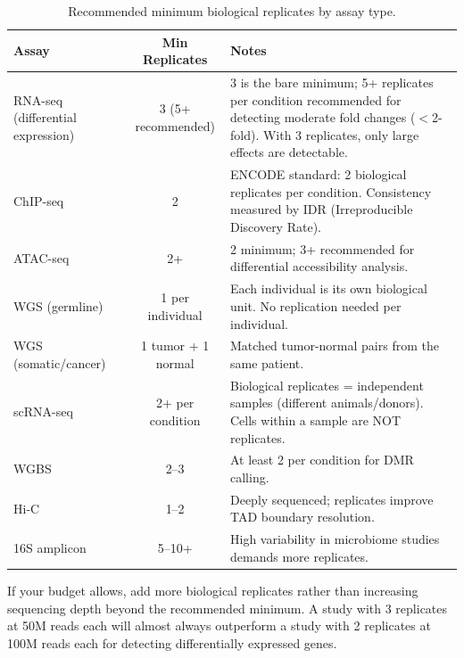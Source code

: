 \begin{table}[htbp]
\centering
\caption{Recommended minimum biological replicates by assay type.}
\label{tab:min-replicates}
\small
\renewcommand{\arraystretch}{1.3}
\begin{tabularx}{\textwidth}{@{}l c X@{}}
\toprule
\textbf{Assay} & \textbf{Min Replicates} & \textbf{Notes} \\
\midrule
RNA-seq (differential expression) & 3 (5+ recommended) & 3 is the bare minimum; 5+ replicates per condition recommended for detecting moderate fold changes ($<$2-fold). With 3 replicates, only large effects are detectable. \\
\addlinespace
ChIP-seq & 2 & ENCODE standard: 2 biological replicates per condition. Consistency measured by IDR (Irreproducible Discovery Rate). \\
\addlinespace
ATAC-seq & 2+ & 2 minimum; 3+ recommended for differential accessibility analysis. \\
\addlinespace
WGS (germline) & 1 per individual & Each individual is its own biological unit. No replication needed per individual. \\
\addlinespace
WGS (somatic/cancer) & 1 tumor + 1 normal & Matched tumor-normal pairs from the same patient. \\
\addlinespace
scRNA-seq & 2+ per condition & Biological replicates = independent samples (different animals/donors). Cells within a sample are NOT replicates. \\
\addlinespace
WGBS & 2--3 & At least 2 per condition for DMR calling. \\
\addlinespace
Hi-C & 1--2 & Deeply sequenced; replicates improve TAD boundary resolution. \\
\addlinespace
16S amplicon & 5--10+ & High variability in microbiome studies demands more replicates. \\
\bottomrule
\end{tabularx}
\end{table}

\begin{tipbox}[title={More Replicates Are Always Better}]
If your budget allows, add more biological replicates rather than increasing sequencing depth beyond the recommended minimum. A study with 3 replicates at 50M reads each will almost always outperform a study with 2 replicates at 100M reads each for detecting differentially expressed genes.
\end{tipbox}

